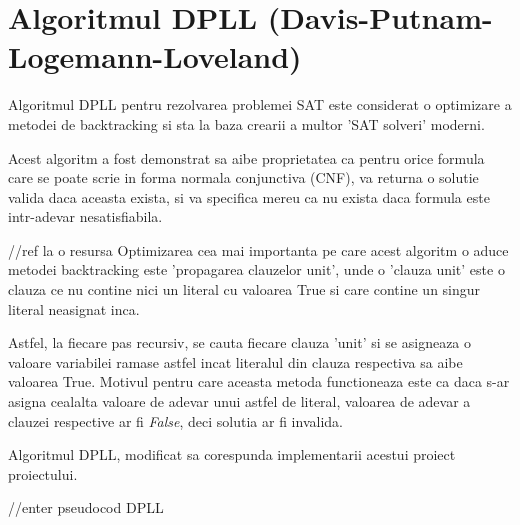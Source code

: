 

\chapter{Algoritmul DPLL (Davis-Putnam-Logemann-Loveland)}

Algoritmul DPLL pentru rezolvarea problemei SAT este considerat o optimizare a metodei de backtracking si sta la baza crearii a multor 'SAT solveri' moderni.

Acest algoritm a fost demonstrat sa aibe proprietatea ca pentru orice formula care se poate scrie in forma normala conjunctiva (CNF), va returna o solutie valida daca aceasta exista, si va specifica mereu ca nu exista daca formula este intr-adevar nesatisfiabila.

//ref la o resursa
Optimizarea cea mai importanta pe care acest algoritm o aduce metodei backtracking este 'propagarea clauzelor unit', unde o 'clauza unit' este o clauza ce nu contine nici un literal cu valoarea True si care contine un singur literal neasignat inca. 

Astfel, la fiecare pas recursiv, se cauta fiecare clauza 'unit' si se asigneaza o valoare variabilei ramase astfel incat literalul din clauza respectiva sa aibe valoarea True. Motivul pentru care aceasta metoda functioneaza este ca daca s-ar asigna cealalta valoare de adevar unui astfel de literal, valoarea de adevar a clauzei respective ar fi \textit{False}, deci solutia ar fi invalida.

\newpage

Algoritmul DPLL, modificat sa corespunda implementarii acestui proiect proiectului.

//enter pseudocod DPLL
\iffalse
\begin{algorithm}
	\KwIn{formula : f \{ length f $\ge$ 1 \} }
	\KwOut{ result : r \{ (r is (Sat tau) $\implies$ calculate\_formula\_value f tau = true ) 
	\newline $\land$ (r is Unsat $\implies$ $\forall$ truth\_assignment : tau . \newline calculate\_formula\_value f tau = false) \} } 
	
	$tau \gets [ ~ ] $ \newline
	\While{$length ~ t  $}{
	
	$new\_var \gets get\_unassigned\_variable f tau$ \newline
	$new\_var\_value \gets assign\_value ~ new\_var$ \newline
	$tau \gets tau[ new\_var : new\_var\_value ]$ \newline
		read current\;
		\eIf{understand}{
			go to next section\;
			current section becomes this one\;
		}{
			go back to the beginning of current section\;
		}
	}
	\caption{How to write algorithms}
\end{algorithm}
\fi


